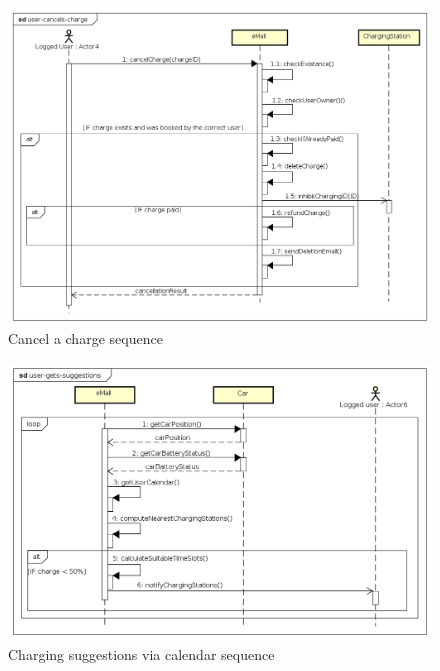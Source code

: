 \begin{figure}[!h]
    \begin{center}
        \includegraphics[keepaspectratio, width=16cm]{Sequence/user-cancels-charge.png}
        \caption{Cancel a charge sequence}
    \end{center}
\end{figure}
\begin{figure}[!h]
    \begin{center}
        \includegraphics[keepaspectratio, width=16cm]{Sequence/user-gets-suggestions.png}
        \caption{Charging suggestions via calendar sequence}
    \end{center}
\end{figure}
